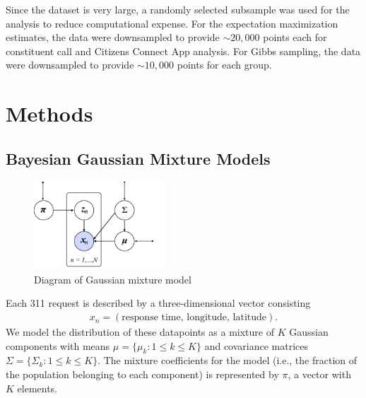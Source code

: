 \documentclass[twoside]{article}
\theoremstyle{theorem}
\theoremstyle{theorem}
\theoremstyle{theorem}
\theoremstyle{lemma}
\theoremstyle{definition}
\theoremstyle{example}
\begin{document}
Since the dataset is very large, a randomly selected subsample was used for the analysis to reduce computational expense. For the expectation maximization estimates, the data were downsampled to provide $\sim20,000$ points each for constituent call and Citizens Connect App analysis. For Gibbs sampling, the data were downsampled to provide $\sim10,000$ points for each group. 
\section{Methods}
\subsection{Bayesian Gaussian Mixture Models}
\begin{figure}
\begin{center}
\includegraphics[width=50mm]{graph_model}
\caption{Diagram of Gaussian mixture model}
\end{center}
\end{figure}
Each 311 request is described by a three-dimensional vector consisting 
\begin{align}
x_n = (\text{response time, longitude, latitude}). 
\end{align}
We model the distribution of these datapoints as a mixture of $K$ Gaussian components with means $\mu = \{\mu_k :  1\leq k\leq K\}$ and covariance matrices $\Sigma = \{\Sigma_k :  1\leq k\leq K\}$. The mixture coefficients for the model (i.e., the fraction of the population belonging to each component) is represented by $\pi$, a vector with $K$ elements.  
\end{document}
